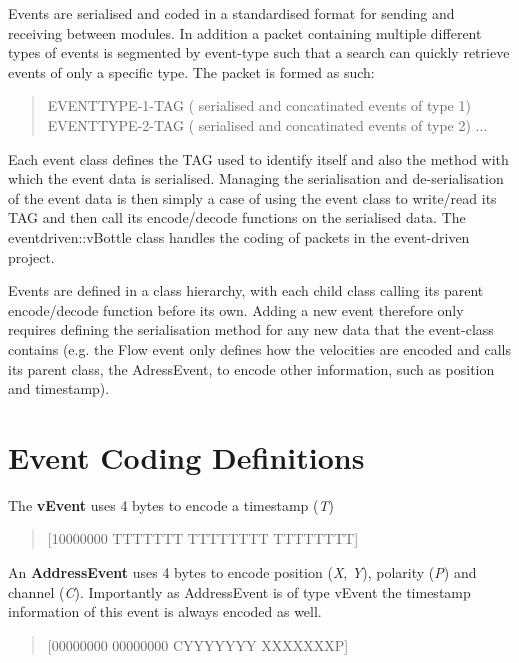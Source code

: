 Events are serialised and coded in a standardised format for sending and receiving between modules. In addition a packet containing multiple different types of events is segmented by event-\/type such that a search can quickly retrieve events of only a specific type. The packet is formed as such\+:

\begin{quote}
E\+V\+E\+N\+T\+T\+Y\+P\+E-\/1-\/\+T\+AG ( serialised and concatinated events of type 1) E\+V\+E\+N\+T\+T\+Y\+P\+E-\/2-\/\+T\+AG ( serialised and concatinated events of type 2) ... \end{quote}


Each event class defines the T\+AG used to identify itself and also the method with which the event data is serialised. Managing the serialisation and de-\/serialisation of the event data is then simply a case of using the event class to write/read its T\+AG and then call its encode/decode functions on the serialised data. The eventdriven\+::v\+Bottle class handles the coding of packets in the event-\/driven project.

Events are defined in a class hierarchy, with each child class calling its parent encode/decode function before its own. Adding a new event therefore only requires defining the serialisation method for any new data that the event-\/class contains (e.\+g. the Flow event only defines how the velocities are encoded and calls its parent class, the Adress\+Event, to encode other information, such as position and timestamp).

 \section*{Event Coding Definitions}

The {\bfseries v\+Event} uses 4 bytes to encode a timestamp ({\itshape T})

\begin{quote}
\mbox{[}10000000 T\+T\+T\+T\+T\+TT T\+T\+T\+T\+T\+T\+TT T\+T\+T\+T\+T\+T\+TT\mbox{]} \end{quote}


An {\bfseries Address\+Event} uses 4 bytes to encode position ({\itshape X}, {\itshape Y}), polarity ({\itshape P}) and channel ({\itshape C}). Importantly as Address\+Event is of type v\+Event the timestamp information of this event is always encoded as well.

\begin{quote}
\mbox{[}00000000 00000000 C\+Y\+Y\+Y\+Y\+Y\+YY X\+X\+X\+X\+X\+X\+XP\mbox{]} \end{quote}


